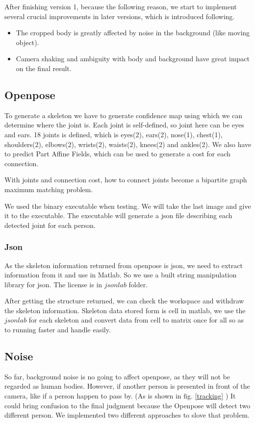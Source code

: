 \documentclass[11pt,twocolumn,letterpaper]{article}
\begin{document}
		\par
		After finishing version 1, because the following reason, we start to implement several crucial improvements in later versions, which is introduced following.
		\begin{itemize}
		\item The cropped body is greatly affected by noise in the background (like moving object).
		\item Camera shaking and ambiguity with body and background have great impact on the final result.
		\end{itemize}
	\subsection{Openpose\cite{cao2017realtime}}
	    \par To generate a skeleton we have to generate confidence map using which we can determine where the joint is.
		Each joint is self-defined, so joint here can be eyes and ears.
		18 joints is defined, which is eyes(2), ears(2), nose(1), chest(1), shoulders(2), elbows(2), wrists(2), waists(2), knees(2) and ankles(2).
		We also have to predict Part Affine Fields, which can be used to generate a cost for each connection.
		\par With joints and connection cost, how to connect joints become a bipartite graph maximum matching problem.
		\par We used the binary executable\cite{cao2017realtime} when testing. We will take the last image and give it to the executable. The executable will generate a json file describing each detected joint for each person.
	    \subsubsection{Json}
        \par As the skeleton information returned from openpose is json, we need to extract information from it and use in Matlab. So we use a built string manipulation library for json. The license is in $jsonlab$ folder.
        \par After getting the structure returned, we can check the workspace and withdraw the skeleton information. Skeleton data stored form is cell in matlab, we use the $jsonlab$ for each skeleton and convert data from cell to matrix once for all so as to running faster and handle easily.

	\subsection{Noise}
\par
So far, background noise is no going to affect openpose, as they will not be regarded as human bodies. However, if another person is presented in front of the camera, like if a person happen to pass by. (As is shown in fig. \ref{tracking} ) It could bring confusion to the final judgment because the Openpose will detect two different person. We implemented two different approaches to slove that problem.
\end{document}
